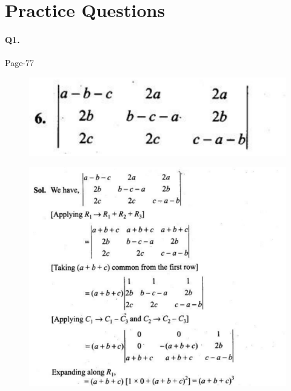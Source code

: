 \documentclass{article}
\begin{document}
\section*{Practice Questions}
\paragraph{Q1.}
\begin{flushright}
Page-77
\end{flushright}
\begin{figure}[H]
    \includegraphics[scale=0.5]{determinants_l5_ps_1.png}
\end{figure}
\begin{figure}[H]
    \includegraphics[scale=0.5]{determinants_l5_ps_12.png}
\end{figure}
\clearpage
\end{document}
